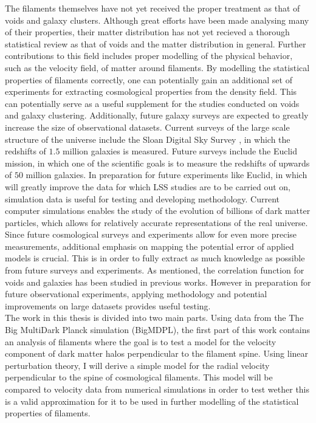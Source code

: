 The filaments themselves have not yet received the proper treatment as that of voids and galaxy clusters. Although great efforts have been made analysing many of their properties\cite{Libeskind_2017}, their matter distribution has not yet recieved a thorough statistical review as that of voids and the matter distribution in general. Further contributions to this field includes proper modelling of the physical behavior, such as the velocity field, of matter around filaments. By modelling the statistical properties of filaments correctly, one can potentially gain an additional set of experiments for extracting cosmological properties from the density field. This can potentially serve as a useful supplement for the studies conducted on voids and galaxy clustering. Additionally, future galaxy surveys are expected to greatly increase the size of observational datasets. Current surveys of the large scale structure of the universe include the Sloan Digital Sky Survey \cite{Eisenstein_2011}, in which the redshifts of $1.5$ million galaxies is measured. Future surveys include the Euclid mission, in which one of the scientific goals is to measure the redshifts of upwards of $50$ million galaxies\cite{eucliddefinition}. In preparation for future experiments like Euclid, in which will greatly improve the data for which LSS studies are to be carried out on, simulation data is useful for testing and developing methodology. Current computer simulations enables the study of the evolution of billions of dark matter particles\cite{Millennium}\cite{Multidark_dataset}, which allows for relatively accurate representations of the real universe. Since future cosmological surveys and experiments allow for even more precise measurements, additional emphasis on mapping the potential error of applied models is crucial. This is in order to fully extract as much knowledge as possible from future surveys and experiments. As mentioned, the correlation function for voids and galaxies has been studied in previous works. However in preparation for future observational experiments, applying methodology and potential improvements on large datasets provides useful testing.\\\indent
The work in this thesis is divided into two main parts. Using data from the The Big MultiDark Planck simulation (BigMDPL)\cite{Multidark_dataset}, the first part of this work contains an analysis of filaments where the goal is to test a model for the velocity component of dark matter halos perpendicular to the filament spine. Using linear perturbation theory, I will derive a simple model for the radial velocity perpendicular to the spine of cosmological filaments. This model will be compared to velocity data from numerical simulations in order to test wether this is a valid approximation for it to be used in further modelling of the statistical properties of filaments.
